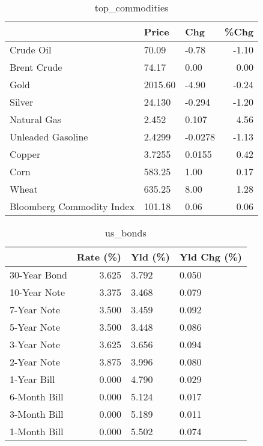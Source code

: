 \documentclass{article}%
\begin{document}
\begin{table}[htbp]%
\caption{top\_commodities}%
\centering%
\begin{adjustbox}{width=1\textwidth}%
\begin{tabular}{lllr}
\toprule
                          &   Price &     Chg &  \%Chg \\
\midrule
               Crude Oil  &   70.09 &   -0.78 & -1.10 \\
             Brent Crude  &   74.17 &    0.00 &  0.00 \\
                    Gold  & 2015.60 &   -4.90 & -0.24 \\
                  Silver  &  24.130 &  -0.294 & -1.20 \\
             Natural Gas  &   2.452 &   0.107 &  4.56 \\
       Unleaded Gasoline  &  2.4299 & -0.0278 & -1.13 \\
                  Copper  &  3.7255 &  0.0155 &  0.42 \\
                    Corn  &  583.25 &    1.00 &  0.17 \\
                   Wheat  &  635.25 &    8.00 &  1.28 \\
Bloomberg Commodity Index &  101.18 &    0.06 &  0.06 \\
\bottomrule
\end{tabular}
%
\end{adjustbox}%
\end{table}

%


\begin{table}[htbp]%
\caption{us\_bonds}%
\centering%
\begin{adjustbox}{width=1\textwidth}%
\begin{tabular}{lrll}
\toprule
             &  Rate (\%) & Yld (\%) & Yld Chg (\%) \\
\midrule
30-Year Bond &     3.625 &   3.792 &       0.050 \\
10-Year Note &     3.375 &   3.468 &       0.079 \\
 7-Year Note &     3.500 &   3.459 &       0.092 \\
 5-Year Note &     3.500 &   3.448 &       0.086 \\
 3-Year Note &     3.625 &   3.656 &       0.094 \\
 2-Year Note &     3.875 &   3.996 &       0.080 \\
 1-Year Bill &     0.000 &   4.790 &       0.029 \\
6-Month Bill &     0.000 &   5.124 &       0.017 \\
3-Month Bill &     0.000 &   5.189 &       0.011 \\
1-Month Bill &     0.000 &   5.502 &       0.074 \\
\bottomrule
\end{tabular}
%
\end{adjustbox}%
\end{table}
\end{document}
